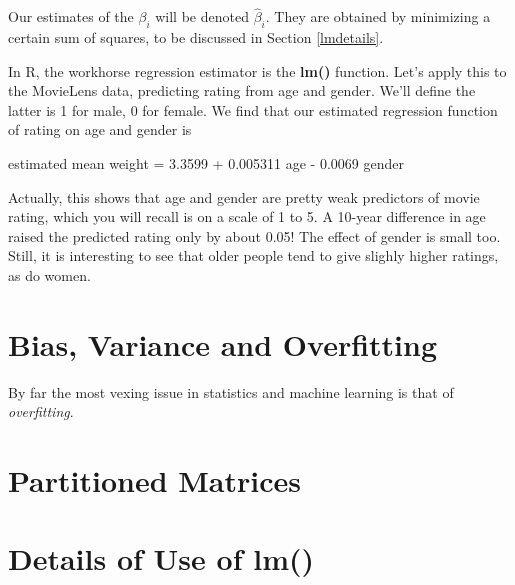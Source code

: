 Our estimates of the $\beta_i$ will be denoted $\widehat{\beta}_i$.
They are obtained by minimizing a certain sum of squares, to be
discussed in Section \ref{lmdetails}.

In R, the workhorse regression estimator is the \textbf{lm()} function.
Let's apply this to the MovieLens data, predicting rating from age and
gender.  We'll define the latter is 1 for male, 0 for female.  We find
that our estimated regression function of rating on age and gender is

estimated mean weight = 3.3599 + 0.005311 age - 0.0069 gender

Actually, this shows that age and gender are pretty weak predictors of
movie rating, which you will recall is on a scale of 1 to 5.  A 10-year
difference in age raised the predicted rating only by about 0.05!  The
effect of gender is small too.  Still, it is interesting to see that
older people tend to give slighly higher ratings, as do women.

\section{Bias, Variance and Overfitting}

By far the most vexing issue in statistics and machine learning is that
of \textit{overfitting}.

\section{Partitioned Matrices}

\section{Details of Use of lm()}
